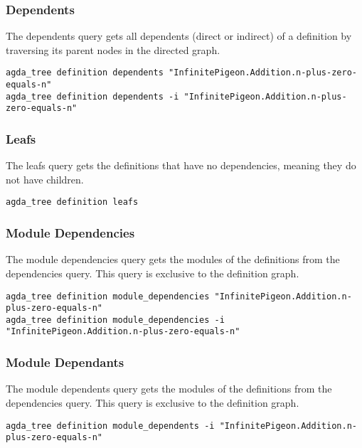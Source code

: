 \subsubsection{Dependents}


The dependents query gets all dependents (direct or indirect) of a
definition by traversing its parent nodes in the directed graph.

\begin{lstlisting}
agda_tree definition dependents "InfinitePigeon.Addition.n-plus-zero-equals-n"
agda_tree definition dependents -i "InfinitePigeon.Addition.n-plus-zero-equals-n"
\end{lstlisting}

\subsubsection{Leafs}

The leafs query gets the definitions that have no dependencies, meaning they do
not have children.

\begin{lstlisting}
agda_tree definition leafs
\end{lstlisting}

\subsubsection{Module Dependencies}

The module dependencies query gets the modules of the definitions from the
dependencies query. This query is exclusive to the definition graph. 

\begin{lstlisting}
agda_tree definition module_dependencies "InfinitePigeon.Addition.n-plus-zero-equals-n"
agda_tree definition module_dependencies -i "InfinitePigeon.Addition.n-plus-zero-equals-n"
\end{lstlisting}

\subsubsection{Module Dependants}

The module dependents query gets the modules of the definitions from the
dependencies query. This query is exclusive to the definition graph. 

\begin{lstlisting}
agda_tree definition module_dependents -i "InfinitePigeon.Addition.n-plus-zero-equals-n"
\end{lstlisting}

